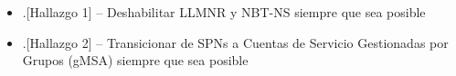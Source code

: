 \begin{itemize}
\item .[Hallazgo 1] – Deshabilitar LLMNR y NBT-NS siempre que sea posible
\item .[Hallazgo 2] – Transicionar de SPNs a Cuentas de Servicio Gestionadas por Grupos (gMSA) siempre que sea posible
\end{itemize}
